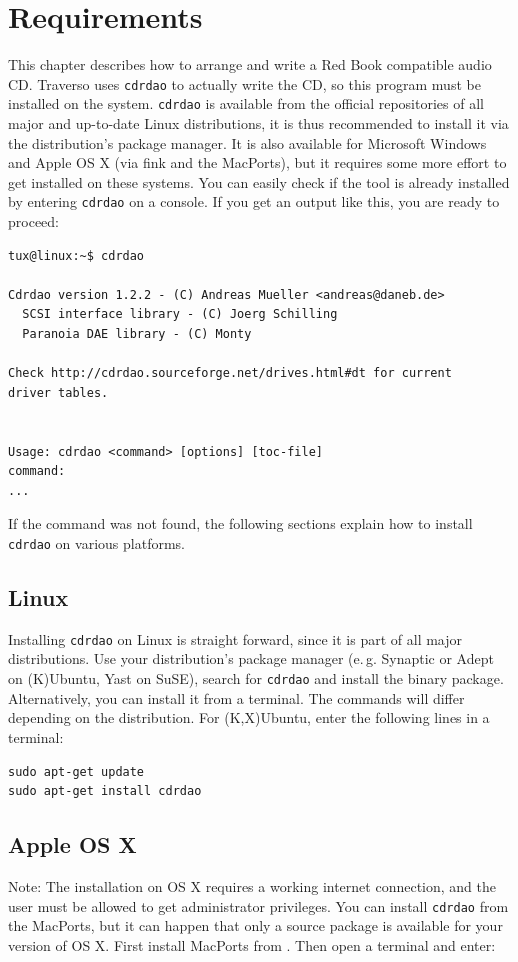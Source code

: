 \section{Requirements}
This chapter describes how to arrange and write a Red Book compatible audio CD. Traverso uses \texttt{cdrdao} to actually write the CD, so this program must be installed on the system. \texttt{cdrdao} is available from the official repositories of all  major and up-to-date Linux distributions, it is thus recommended to install it via the distribution's package manager. It is also available for Microsoft Windows and Apple OS X (via fink and the MacPorts), but it requires some more effort to get installed on these systems. You can easily check if the tool is already installed by entering \texttt{cdrdao} on a console. If you get an output like this, you are ready to proceed:

\footnotesize
\begin{verbatim}
tux@linux:~$ cdrdao

Cdrdao version 1.2.2 - (C) Andreas Mueller <andreas@daneb.de>
  SCSI interface library - (C) Joerg Schilling
  Paranoia DAE library - (C) Monty

Check http://cdrdao.sourceforge.net/drives.html#dt for current 
driver tables.


Usage: cdrdao <command> [options] [toc-file]
command:
...
\end{verbatim}
\normalsize

If the command was not found, the following sections explain how to install \texttt{cdrdao} on various platforms.

\subsection{Linux}
Installing \texttt{cdrdao} on Linux is straight forward, since it is part of all major distributions. Use your distribution's package manager (e.\,g. Synaptic or Adept on (K)Ubuntu, Yast on SuSE), search for \texttt{cdrdao} and install the binary package. Alternatively, you can install it from a terminal. The commands will differ depending on the distribution. For (K,X)Ubuntu, enter the following lines in a terminal:

\begin{verbatim}
sudo apt-get update
sudo apt-get install cdrdao
\end{verbatim}

\subsection{Apple OS X}
Note: The installation on OS X requires a working internet connection, and the user must be allowed to get administrator privileges. You can install \texttt{cdrdao} from the MacPorts, but it can happen that only a source package is available for your version of OS X. First install MacPorts from \cite{macports}. Then open a terminal and enter:


